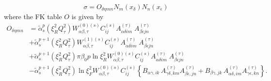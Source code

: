 \documentclass[11pt]{article}
\newcommand{\be}{\begin{equation}}
\newcommand{\ee}{\end{equation}}
\begin{document}
\be \sigma = O_{\delta\eta m n} N_m(x_\delta)N_n(x_\epsilon)\ee
where the FK table $O$ is given by
 \begin{align}
 O_{\delta\eta m n} &=    \tilde{\alpha}_s^{p}(\xi_R^2Q^2_\tau)W_{\alpha\beta,\tau}^{(0)(s)} C^{(s)}_{ij} A^{(\tau)}_{\alpha\delta im}\; A^{(\tau)}_{\beta\epsilon jn} \nonumber \\
  & + \tilde{\alpha}_s^{p+1}(\xi_R^2Q^2_\tau) W_{\alpha\beta,\tau}^{(1)(s)} C^{(s)}_{ij} A^{(\tau)}_{\alpha\delta im}\; A^{(\tau)}_{\beta\epsilon jn} \nonumber \\
  & + \tilde{\alpha}_s^{p+1}(\xi_R^2Q^2_\tau) \pi \beta_0 p \ln \xi_R^2 W_{\alpha\beta,\tau}^{(0)(s)} C^{(s)}_{ij} A^{(\tau)}_{\alpha\delta im}\; A^{(\tau)}_{\beta\epsilon jn} \nonumber \\
  & - \tilde{\alpha}_s^{p+1}(\xi_R^2Q^2_\tau) \ln \xi_F^2  W_{\alpha\beta,\tau}^{(0)(s)} C^{(s)}_{ij} \left\{ B_{\alpha\gamma, ik} \, A^{(\tau)}_{\gamma\delta, km} A^{(\tau)}_{\beta\epsilon, jn} +  B_{\beta\gamma, jk} \, A^{(\tau)}_{\alpha\delta, im} A^{(\tau)}_{\gamma\epsilon, kn}  \right\}.  
  \end{align}
\end{document}
